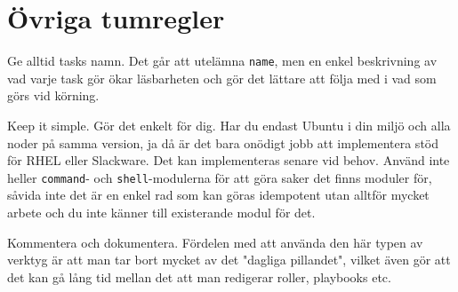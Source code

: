 \section{Övriga tumregler}
Ge alltid tasks namn. Det går att utelämna \texttt{name}, men en enkel beskrivning av vad varje task gör ökar 
läsbarheten och gör det lättare att följa med i vad som görs vid körning.

Keep it simple. Gör det enkelt för dig. Har du endast Ubuntu i din miljö och alla noder på samma version, ja då 
är det bara onödigt jobb att implementera stöd för RHEL eller Slackware. Det kan implementeras senare vid behov.
Använd inte heller \texttt{command}- och \texttt{shell}-modulerna för att göra saker det finns moduler för, såvida
inte det är en enkel rad som kan göras idempotent utan alltför mycket arbete och du inte känner till existerande
modul för det.

Kommentera och dokumentera. Fördelen med att använda den här typen av verktyg är att man tar bort mycket av det 
"dagliga pillandet", vilket även gör att det kan gå lång tid mellan det att man redigerar roller, playbooks etc. 
